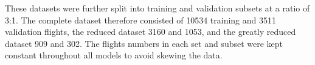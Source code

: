 These datasets were further split into training and validation subsets at a ratio of 3:1. The complete dataset therefore consisted of 10534 training and 3511 validation flights, the reduced dataset 3160 and 1053, and the greatly reduced dataset 909 and 302. The flights numbers in each set and subset were kept constant throughout all models to avoid skewing the data.




